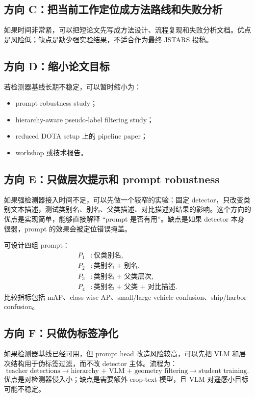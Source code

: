 \documentclass[11pt,a4paper]{ctexart}
\begin{document}
\subsection{方向 C：把当前工作定位成方法路线和失败分析}

如果时间非常紧，可以把短论文先写成方法设计、流程复现和失败分析文档。优点是风险低；缺点是缺少强实验结果，不适合作为最终 JSTARS 投稿。

\subsection{方向 D：缩小论文目标}

若检测器基线长期不稳定，可以暂时缩小为：
\begin{itemize}
  \item prompt robustness study；
  \item hierarchy-aware pseudo-label filtering study；
  \item reduced DOTA setup 上的 pipeline paper；
  \item workshop 或技术报告。
\end{itemize}

\subsection{方向 E：只做层次提示和 prompt robustness}

如果强检测器接入时间不足，可以先做一个较窄的实验：固定 detector，只改变类别文本描述，测试类别名、别名、父类描述、对比描述对结果的影响。这个方向的优点是实现简单，能够直接解释 ``prompt 是否有用''。缺点是如果 detector 本身很弱，prompt 的效果会被定位错误掩盖。

可设计四组 prompt：
\[
\begin{aligned}
P_1 &: \text{仅类别名},\\
P_2 &: \text{类别名 + 别名},\\
P_3 &: \text{类别名 + 父类层次},\\
P_4 &: \text{类别名 + 父类 + 对比描述}.
\end{aligned}
\]
比较指标包括 mAP、class-wise AP、small/large vehicle confusion、ship/harbor confusion。

\subsection{方向 F：只做伪标签净化}

如果检测器基线已经可用，但 prompt head 改造风险较高，可以先把 VLM 和层次结构用于伪标签过滤，而不改 detector 主体。流程为：
\[
\text{teacher detections}\rightarrow
\text{hierarchy + VLM + geometry filtering}\rightarrow
\text{student training}.
\]
优点是对检测器侵入小；缺点是需要额外 crop-text 模型，且 VLM 对遥感小目标可能不稳定。
\end{document}
